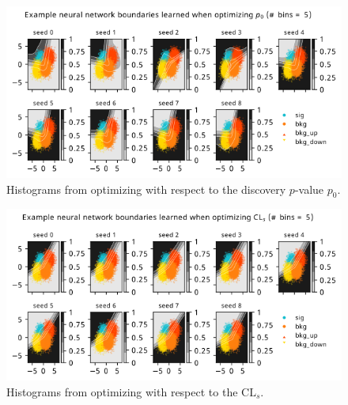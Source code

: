 \documentclass[
  11pt,
  numbers=noendperiod]{book}
\begin{document}
\begin{figure}

{\centering \includegraphics{./images/new-grid-models-discovery-5bin.png}

}

\caption{Histograms from optimizing with respect to the discovery
\(p\)-value \(p_0\).}

\end{figure}

\begin{figure}

{\centering \includegraphics{./images/new-grid-models-CLs-5bin.png}

}

\caption{Histograms from optimizing with respect to the
\(\mathrm{CL}_s\).}

\end{figure}
\end{document}
